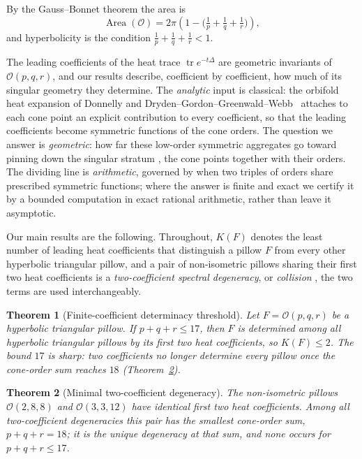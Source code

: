 \documentclass[12pt, letterpaper]{article}
\theoremstyle{definition}
\theoremstyle{plain}
\newtheorem{mainthm}{Theorem}
\begin{document}
By the Gauss--Bonnet theorem the area is
\begin{equation}
    \operatorname{Area}(\mathcal{O}) = 2\pi \left( 1 - \Big( \tfrac{1}{p} + \tfrac{1}{q} + \tfrac{1}{r} \Big) \right),
    \label{eq:area}
\end{equation}
and hyperbolicity is the condition $\tfrac1p+\tfrac1q+\tfrac1r<1$.

The leading coefficients of the heat trace $\operatorname{tr}e^{-t\Delta}$ are geometric invariants of $\mathcal{O}(p,q,r)$, and our results describe, coefficient by coefficient, how much of its singular geometry they determine. The \emph{analytic} input is classical: the orbifold heat expansion of Donnelly and Dryden--Gordon--Greenwald--Webb~\cite{donnelly1976, dggw2008} attaches to each cone point an explicit contribution to every coefficient, so that the leading coefficients become symmetric functions of the cone orders. The question we answer is \emph{geometric}: how far these low-order symmetric aggregates go toward pinning down the singular stratum ,  the cone points together with their orders. The dividing line is \emph{arithmetic}, governed by when two triples of orders share prescribed symmetric functions; where the answer is finite and exact we certify it by a bounded computation in exact rational arithmetic, rather than leave it asymptotic.

Our main results are the following. Throughout, $K(F)$ denotes the least number of leading heat coefficients that distinguish a pillow $F$ from every other hyperbolic triangular pillow, and a pair of non-isometric pillows sharing their first two heat coefficients is a \emph{two-coefficient spectral degeneracy}, or \emph{collision} ,  the two terms are used interchangeably.

\begin{mainthm}[Finite-coefficient determinacy threshold]\label{thmA}
Let $F=\mathcal{O}(p,q,r)$ be a hyperbolic triangular pillow. If $p+q+r\le17$, then $F$ is determined among all hyperbolic triangular pillows by its first two heat coefficients, so $K(F)\le2$. The bound $17$ is sharp: two coefficients no longer determine every pillow once the cone-order sum reaches $18$ (Theorem~\ref{thmB}).
\end{mainthm}

\begin{mainthm}[Minimal two-coefficient degeneracy]\label{thmB}
The non-isometric pillows $\mathcal{O}(2,8,8)$ and $\mathcal{O}(3,3,12)$ have identical first two heat coefficients. Among all two-coefficient degeneracies this pair has the smallest cone-order sum, $p+q+r=18$; it is the unique degeneracy at that sum, and none occurs for $p+q+r\le17$.
\end{mainthm}
\end{document}
